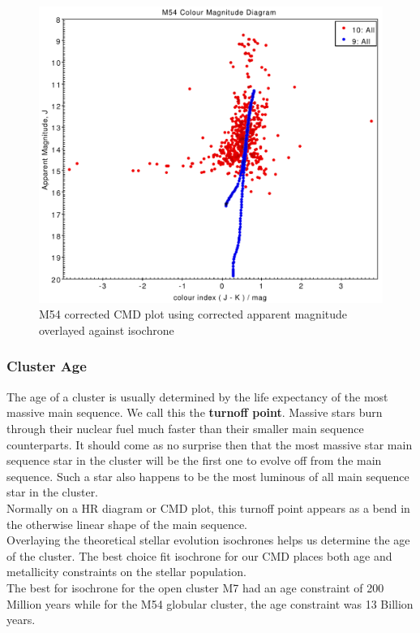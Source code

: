 \documentclass[12pt, twocolumn]{aastex62}
\begin{document}
		\begin{figure}
			\includegraphics[scale=0.34]{m54_cmd_all}
			\caption{M54 corrected CMD plot using corrected apparent magnitude overlayed against isochrone}
			\label{fig: m54_cmd_all}
		\end{figure}
		\subsubsection{Cluster Age}
		The age of a cluster is usually determined by the life expectancy of the most massive main sequence. We call this the \textbf{turnoff point}. Massive stars burn through their nuclear fuel much faster than their smaller main sequence counterparts. It should come as no surprise then that the most massive star main sequence star in the cluster will be the first one to evolve off from the main sequence. Such a star also happens to be the most luminous of all main sequence star in the cluster.\\
		Normally on a HR diagram or CMD plot, this turnoff point appears as a bend in the otherwise linear shape of the main sequence.\\
		Overlaying the theoretical stellar evolution isochrones helps us determine the age of the cluster. The best choice fit isochrone for our CMD places both age and metallicity constraints on the stellar population.\\
		The best for isochrone for the open cluster M7 had an age constraint of 200 Million years while for the M54 globular cluster, the age constraint was 13 Billion years.
\end{document}
